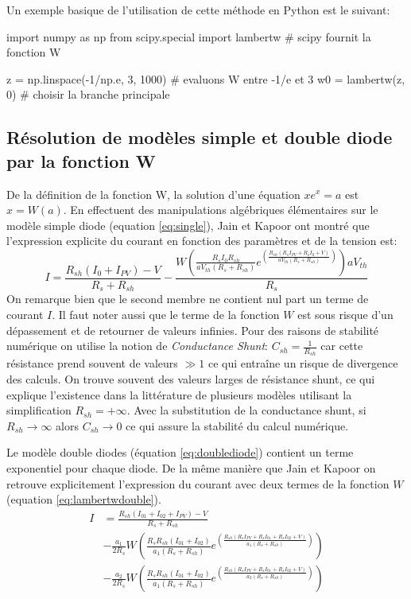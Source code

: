 Un exemple basique de l'utilisation de cette méthode en Python est le suivant:

\begin{python}[basicstyle=\tiny]
import numpy as np 
from scipy.special import lambertw # scipy fournit la fonction W

z = np.linspace(-1/np.e, 3, 1000) # evaluons W entre -1/e et 3
w0 = lambertw(z, 0) # choisir la branche principale
\end{python}

\subsection{Résolution de modèles simple et double diode par la fonction W}
De la définition de la fonction W, la solution d'une équation $xe^x = a$ est $x = W(a)$. En effectuent des manipulations algébriques élémentaires sur le modèle simple diode (equation \ref{eq:single}), Jain et Kapoor ont montré que l'expression explicite du courant en fonction des paramètres et de la tension est:
\begin{equation}
  \label{eq:lambertwsingle}
  I = \frac{R_{sh}(I_0 + I_{PV}) - V}{R_s + R_{sh}} - \frac{W\left(\frac{R_s I_0 R_{sh}}{a V_{th}(R_s + R_{sh})}e^{\left(\frac{R_{sh}(R_s I_{PV} + R_s I_0 + V)}{a V_{th} (R_s + R_{sh})}\right)}\right)aV_{th}}{R_s}
\end{equation}
On remarque bien que le second membre ne contient nul part un terme de courant $I$. Il faut noter aussi que le terme de la fonction $W$ est sous risque d'un dépassement et de retourner de valeurs infinies. Pour des raisons de stabilité numérique on utilise la notion de \textit{Conductance Shunt}: $C_{sh} = \frac{1}{R_{sh}}$ car cette résistance prend souvent de valeurs $\gg 1$ ce qui entraîne un risque de divergence des calculs. On trouve souvent des valeurs larges de résistance shunt, ce qui explique l'existence dans la littérature de plusieurs modèles utilisant la simplification $R_{sh} = + \infty$. Avec la substitution de la conductance shunt, si $R_{sh}\rightarrow\infty$ alors $C_{sh} \rightarrow 0$ ce qui assure la stabilité du calcul numérique.

Le modèle double diodes (équation \ref{eq:doublediode}) contient un terme exponentiel pour chaque diode. De la même manière que Jain et Kapoor on retrouve explicitement l'expression du courant avec deux termes de la fonction $W$ (equation \ref{eq:lambertwdouble}).
\begin{equation}
  \label{eq:lambertwdouble}
  \begin{split}
    I &= \frac{R_{sh} (I_{01} + I_{02} + I_{PV}) - V}{R_s + R_{sh}}\\ 
    &- \frac{a_1}{2 R_s} W\left( \frac{R_s R_{sh}(I_{01} + I_{02})}{a_1 (R_s + R_{sh})}e^{\left(\frac{R_{sh}(R_s I_{PV} + R_s I_{01} + R_s I_{02} + V)}{a_1 (R_s + R_{sh})}\right)}\right)\\ 
    &- \frac{a_2}{2 R_s} W\left( \frac{R_s R_{sh}(I_{01} + I_{02})}{a_1 (R_s + R_{sh})}e^{\left(\frac{R_{sh}(R_s I_{PV} + R_s I_{01} + R_s I_{02} + V)}{a_2 (R_s + R_{sh})}\right)}\right)
  \end{split}
\end{equation}

